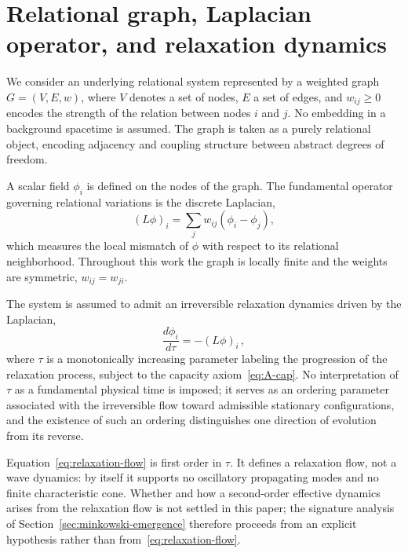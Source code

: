 \documentclass[epj]{svjour}
\begin{document}
  \section{Relational graph, Laplacian operator, and relaxation dynamics}
  \label{sec:rel-graph-laplacian-op-and-relaxation-dynamics}

  We consider an underlying relational system represented by a weighted graph $G = (V,E,w)$, where
  $V$ denotes a set of nodes, $E$ a set of edges, and $w_{ij} \ge 0$ encodes the strength of the
  relation between nodes $i$ and $j$.
  No embedding in a background spacetime is assumed.
  The graph is taken as a purely relational object, encoding adjacency and coupling structure
  between abstract degrees of freedom.

  A scalar field $\phi_i$ is defined on the nodes of the graph.
  The fundamental operator governing relational variations is the discrete Laplacian,
  \begin{equation}
    (L \phi)_i = \sum_{j} w_{ij} \left( \phi_i - \phi_j \right),
    \label{eq:discrete-laplacian}
  \end{equation}
  which measures the local mismatch of $\phi$ with respect to its relational neighborhood.
  Throughout this work the graph is locally finite and the weights are symmetric,
  $w_{ij} = w_{ji}$.

  The system is assumed to admit an irreversible relaxation dynamics driven by the Laplacian,
  \begin{equation}
    \frac{d \phi_i}{d \tau} = - (L \phi)_i \,,
    \label{eq:relaxation-flow}
  \end{equation}
  where $\tau$ is a monotonically increasing parameter labeling the progression of the relaxation
  process, subject to the capacity axiom~\eqref{eq:A-cap}.
  No interpretation of $\tau$ as a fundamental physical time is imposed; it serves as an ordering
  parameter associated with the irreversible flow toward admissible stationary configurations, and
  the existence of such an ordering distinguishes one direction of evolution from its reverse.

  Equation~\eqref{eq:relaxation-flow} is first order in $\tau$.
  It defines a relaxation flow, not a wave dynamics: by itself it supports no oscillatory
  propagating modes and no finite characteristic cone.
  Whether and how a second-order effective dynamics arises from the relaxation flow is not settled
  in this paper; the signature analysis of Section~\ref{sec:minkowski-emergence} therefore proceeds
  from an explicit hypothesis rather than from~\eqref{eq:relaxation-flow}.
\end{document}
